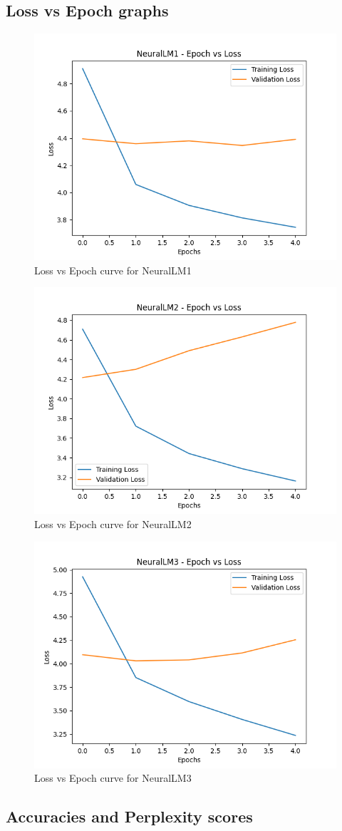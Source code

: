 \documentclass{article}
\begin{document}
\subsection{Loss vs Epoch graphs}
\begin{figure}[H]
    \centering
    \includegraphics[width=0.5\linewidth]{NeuralLM1Loss.png}
    \caption{Loss vs Epoch curve for NeuralLM1}
\end{figure}

\begin{figure}[H]
    \centering
    \includegraphics[width=0.5\linewidth]{NeuralLM2Loss.png}
    \caption{Loss vs Epoch curve for NeuralLM2}
\end{figure}

\begin{figure}[H]
    \centering
    \includegraphics[width=0.5\linewidth]{NeuralLM3Loss.png}
    \caption{Loss vs Epoch curve for NeuralLM3}
\end{figure}


\subsection{Accuracies and Perplexity scores}
\end{document}
